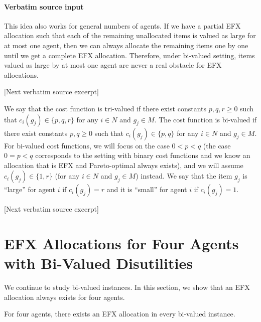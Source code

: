 \documentclass[10pt]{article}
\begin{document}
\paragraph{Verbatim source input}
\begin{ReviewVerbatim}
\begin{remark}
    This idea also works for general numbers of agents.
    If we have a partial EFX allocation such that each of the remaining unallocated items is valued as large for at most one agent, then we can always allocate the remaining items one by one until we get a complete EFX allocation.
    Therefore, under bi-valued setting, items valued as large by at most one agent are never a real obstacle for EFX allocations.
\end{remark}

[Next verbatim source excerpt]

We say that the cost function is tri-valued if there exist constants $p,q,r\geq 0$ such that $c_i(g_j)\in\{p,q,r\}$ for any $i\in N$ and $g_j\in M$.
The cost function is bi-valued if there exist constants $p,q\geq 0$ such that $c_i(g_j)\in\{p,q\}$ for any $i\in N$ and $g_j\in M$.
For bi-valued cost functions, we will focus on the case $0<p<q$ (the case $0=p<q$ corresponds to the setting with binary cost functions and we know an allocation that is EFX and Pareto-optimal always exists), and we will assume $c_i(g_j)\in\{1,r\}$ (for any $i\in N$ and $g_j\in M$) instead.
We say that the item $g_j$ is ``large'' for agent $i$ if $c_i(g_j)=r$ and it is ``small'' for agent $i$ if $c_i(g_j)=1$.

[Next verbatim source excerpt]

\section{EFX Allocations for Four Agents with Bi-Valued Disutilities}
We continue to study bi-valued instances.
In this section, we show that an EFX allocation always exists for four agents.

\begin{theorem}\label{thm:four}
    For four agents, there exists an EFX allocation in every bi-valued instance.
\end{theorem}


\end{ReviewVerbatim}
\end{document}
